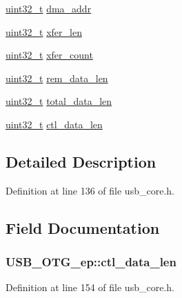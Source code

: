 \begin{DoxyCompactItemize}
\hyperlink{stdint_8h_a435d1572bf3f880d55459d9805097f62}{uint32\-\_\-t} \hyperlink{struct_u_s_b___o_t_g__ep_acfc41535a5132d7f9c657c5aed9c3e0f}{dma\-\_\-addr}
\item 
\hyperlink{stdint_8h_a435d1572bf3f880d55459d9805097f62}{uint32\-\_\-t} \hyperlink{struct_u_s_b___o_t_g__ep_a3e57f0f46e9ba0300fc51321cf05b652}{xfer\-\_\-len}
\item 
\hyperlink{stdint_8h_a435d1572bf3f880d55459d9805097f62}{uint32\-\_\-t} \hyperlink{struct_u_s_b___o_t_g__ep_a23619223b14a29a11d1104cc759a4bd3}{xfer\-\_\-count}
\item 
\hyperlink{stdint_8h_a435d1572bf3f880d55459d9805097f62}{uint32\-\_\-t} \hyperlink{struct_u_s_b___o_t_g__ep_a30b0601d0ad17930b859f6c078d1ff46}{rem\-\_\-data\-\_\-len}
\item 
\hyperlink{stdint_8h_a435d1572bf3f880d55459d9805097f62}{uint32\-\_\-t} \hyperlink{struct_u_s_b___o_t_g__ep_a205c3a0a7050751fe9c96fc734ba1d97}{total\-\_\-data\-\_\-len}
\item 
\hyperlink{stdint_8h_a435d1572bf3f880d55459d9805097f62}{uint32\-\_\-t} \hyperlink{struct_u_s_b___o_t_g__ep_a9a9076ff6d3f1e78420273124907239c}{ctl\-\_\-data\-\_\-len}
\end{DoxyCompactItemize}


\subsection{Detailed Description}


Definition at line 136 of file usb\-\_\-core.\-h.



\subsection{Field Documentation}
\hypertarget{struct_u_s_b___o_t_g__ep_a9a9076ff6d3f1e78420273124907239c}{
\subsubsection[{ctl\-\_\-data\-\_\-len}]{ U\-S\-B\-\_\-\-O\-T\-G\-\_\-ep\-::ctl\-\_\-data\-\_\-len}}\label{struct_u_s_b___o_t_g__ep_a9a9076ff6d3f1e78420273124907239c}


Definition at line 154 of file usb\-\_\-core.\-h.

